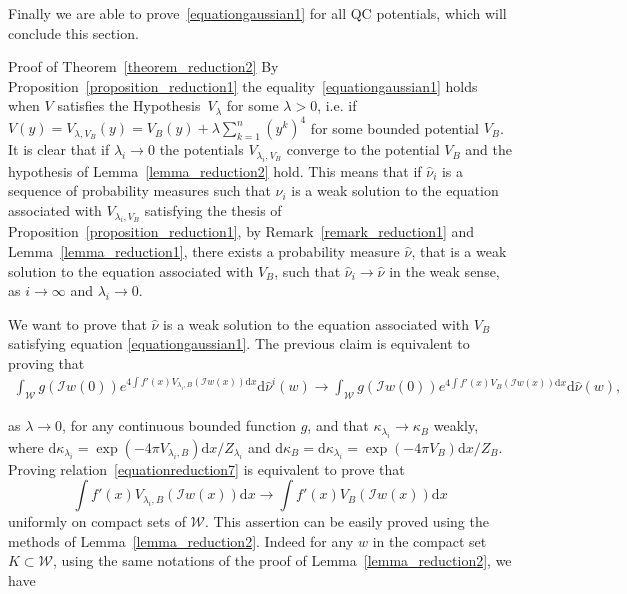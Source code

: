 \documentclass[a4paper,10pt]{article}
\newcommand{\mathd}{\mathrm{d}}
\newenvironment{proof*}[1]{\noindent\textbf{#1\ }}{\hspace*{\fill}$\Box$\medskip}
\begin{document}
Finally we are able to prove~{\eqref{equationgaussian1}} for all QC
potentials, which will conclude this section.

\begin{proof*}{Proof of Theorem~\ref{theorem_reduction2}}
  By Proposition~\ref{proposition_reduction1} the
  equality~{\eqref{equationgaussian1}} holds when $V$ satisfies the
  Hypothesis~$V_{\lambda}$ for some $\lambda > 0$, i.e. if $V (y) =
  V_{\lambda, V_B} (y) = V_B (y) + \lambda \sum_{k = 1}^n (y^k)^4$ for some
  bounded potential $V_B$. It is clear that if $\lambda_i \rightarrow 0$ the
  potentials $V_{\lambda_i, V_B}$ converge to the potential $V_B$ and the
  hypothesis of Lemma~\ref{lemma_reduction2} hold. This means that if
  $\hat{\nu}_i$ is a sequence of probability measures such that $\hat{\nu}_i$
  is a weak solution to the equation associated with $V_{\lambda_i, V_B}$
  satisfying the thesis of Proposition~\ref{proposition_reduction1}, by
  Remark~\ref{remark_reduction1} and Lemma~\ref{lemma_reduction1}, there
  exists a probability measure $\hat{\nu}$, that is a weak solution to the
  equation associated with $V_B$, such that $\hat{\nu}_i \rightarrow
  \hat{\nu}$ in the weak sense, as $i \rightarrow \infty$ and $\lambda_i
  \rightarrow 0$.
  
  We want to prove that $\hat{\nu}$ is a weak solution to the equation
  associated with $V_B$ satisfying equation {\eqref{equationgaussian1}}. The
  previous claim is equivalent to proving that
    \begin{multline}
      \int_{\mathcal{W}} g (\mathcal{I}w (0)) e^{4 \int f' (x) V_{\lambda_i,
      B} (\mathcal{I}w (x)) \mathd x} \mathd \hat{\nu}^i (w) \longrightarrow \int_{\mathcal{W}} g (\mathcal{I}w (0)) e^{4 \int f' (x)
      V_B (\mathcal{I}w (x)) \mathd x} \mathd \hat{\nu} (w),
\label{equationreduction7}    
\end{multline}
    
    
  as $\lambda \rightarrow 0$, for any continuous bounded function $g$, and
  that $\kappa_{\lambda_i} \rightarrow \kappa_B$ weakly, where $\mathd
  \kappa_{\lambda_i} = \exp (- 4 \pi V_{\lambda_i, B}) \mathd x /
  Z_{\lambda_i}$ and $\mathd \kappa_B = \mathd \kappa_{\lambda_i} = \exp (- 4
  \pi V_B) \mathd x / Z_B$. Proving relation~{\eqref{equationreduction7}} is
  equivalent to prove that
  \[ \int f' (x) V_{\lambda_i, B} (\mathcal{I}w (x)) \mathd x \rightarrow \int
     f' (x) V_B (\mathcal{I}w (x)) \mathd x \]
  uniformly on compact sets of $\mathcal{W}$. This assertion can be easily
  proved using the methods of Lemma~\ref{lemma_reduction2}. Indeed for any $w$
  in the compact set $K \subset \mathcal{W}$, using the same notations of the
  proof of Lemma~\ref{lemma_reduction2}, we have
  

\end{proof*}
\end{document}
